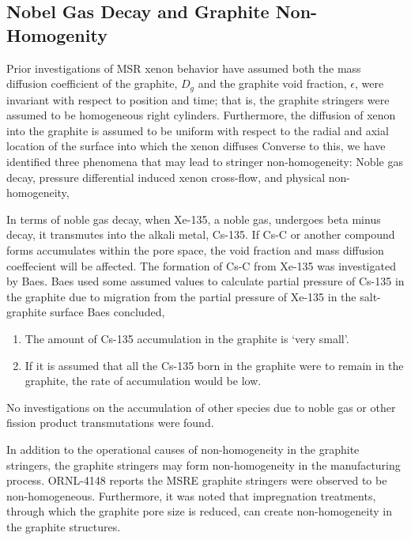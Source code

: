 \subsection{Nobel Gas Decay and Graphite Non-Homogenity} \label{sec:nobel}

Prior investigations of MSR xenon behavior have assumed both the mass diffusion coefficient of the graphite, $D_g$ and the graphite void fraction, $\epsilon$, were invariant with respect to position and time; that is, the graphite stringers were assumed to be homogeneous right cylinders. Furthermore, the diffusion of xenon into the graphite is assumed to be uniform with respect to the radial and axial location of the surface into which the xenon diffuses  Converse to this, we have identified three phenomena that may lead to stringer non-homogeneity:  Noble gas decay,  pressure differential induced xenon cross-flow, and  physical non-homogeneity,

In terms of noble gas decay, when Xe-135, a noble gas, undergoes beta minus decay, it transmutes into the alkali metal, Cs-135.  If Cs-C or another compound forms accumulates within the pore space, the void fraction and mass diffusion coeffecient will be affected. The formation of Cs-C from Xe-135 was investigated by Baes.\cite[p. 15]{ORNL4037} Baes used some assumed values to calculate partial pressure of Cs-135 in the graphite due to migration from the partial pressure of Xe-135 in the salt-graphite surface Baes concluded,
    \begin{enumerate}
        \item The amount of Cs-135 accumulation in the graphite is ‘very small’.
        \item If it is assumed that all the Cs-135 born in the graphite were to remain in the graphite, the rate of accumulation would be low.
    \end{enumerate}
No investigations on the accumulation of other species due to noble gas or other fission product transmutations were found.



In addition to the operational causes of non-homogeneity in the graphite stringers, the graphite stringers may form non-homogeneity in the manufacturing process.  ORNL-4148 reports the MSRE graphite stringers were observed to be non-homogeneous. \cite[p.25 ]{ORNL4148} Furthermore, it was noted that impregnation treatments, through which the graphite pore size is reduced, can create non-homogeneity in the graphite structures.